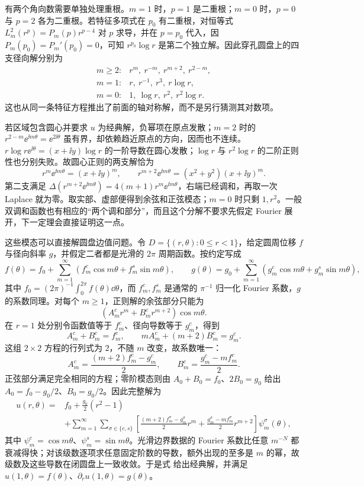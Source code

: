 有两个角向数需要单独处理重根。$m=1$ 时，$p=1$ 是二重根；$m=0$ 时，$p=0$ 与 $p=2$ 各为二重根。若特征多项式在 $p_0$ 有二重根，对恒等式
$L_m^2(r^p)=P_m(p)r^{p-4}$ 对 $p$ 求导，并在 $p=p_0$ 代入，因
$P_m(p_0)=P_m'(p_0)=0$，可知 $r^{p_0}\log r$ 是第二个独立解。因此穿孔圆盘上的四支径向解分别为
\[
\begin{array}{ll}
m\ge2:&r^m,\ r^{-m},\ r^{m+2},\ r^{2-m},\\
m=1:&r,\ r^{-1},\ r^3,\ r\log r,\\
m=0:&1,\ \log r,\ r^2,\ r^2\log r.
\end{array}
\]
这也从同一条特征方程推出了前面的轴对称解，而不是另行猜测其对数项。

若区域包含圆心并要求 $u$ 为经典解，负幂项在原点发散；$m=2$ 时的
$r^{2-m}\ee^{\ii m\theta}=\ee^{2\ii\theta}$ 虽有界，却依赖趋近原点的方向，因而也不连续。$r\log r\ee^{\ii\theta}=(x+\ii y)\log r$ 的一阶导数在圆心发散；$\log r$ 与 $r^2\log r$ 的二阶正则性也分别失败。故圆心正则的两支解恰为
\[
r^m\ee^{\ii m\theta}=(x+\ii y)^m,
\qquad
r^{m+2}\ee^{\ii m\theta}=(x^2+y^2)(x+\ii y)^m.
\]
第二支满足 $\Delta(r^{m+2}\ee^{\ii m\theta})=4(m+1)r^m\ee^{\ii m\theta}$，右端已经调和，再取一次 Laplace 就为零。取实部、虚部便得到余弦和正弦模态；$m=0$ 时只剩 $1,r^2$。一般双调和函数也有相应的“两个调和部分”，而且这个分解不要求先假定 Fourier 展开，下一定理会直接证明这一点。

这些模态可以直接解圆盘边值问题。令 $D=\{(r,\theta):0\le r<1\}$，给定圆周位移 $f$ 与径向斜率 $g$，并假定二者都是光滑的 $2\pi$ 周期函数。按约定写成
\[
f(\theta)=f_0+\sum_{m=1}^\infty(f_m^c\cos m\theta+f_m^s\sin m\theta),
\qquad
g(\theta)=g_0+\sum_{m=1}^\infty(g_m^c\cos m\theta+g_m^s\sin m\theta),
\]
其中 $f_0=(2\pi)^{-1}\int_0^{2\pi}f(\theta)\dd\theta$，而 $f_m^c,f_m^s$ 是通常的 $\pi^{-1}$ 归一化 Fourier 系数，$g$ 的系数同理。对每个 $m\ge1$，正则解的余弦部分只能为
\[
(A_m^c r^m+B_m^c r^{m+2})\cos m\theta.
\]
在 $r=1$ 处分别令函数值等于 $f_m^c$、径向导数等于 $g_m^c$，得到
\[
A_m^c+B_m^c=f_m^c,\qquad mA_m^c+(m+2)B_m^c=g_m^c.
\]
这组 $2\times2$ 方程的行列式为 $2$，不随 $m$ 改变，故系数唯一：
\[
A_m^c=\frac{(m+2)f_m^c-g_m^c}{2},\qquad
B_m^c=\frac{g_m^c-mf_m^c}{2}.
\]
正弦部分满足完全相同的方程；零阶模态则由 $A_0+B_0=f_0$、$2B_0=g_0$ 给出 $A_0=f_0-g_0/2$、$B_0=g_0/2$。因此完整解为
\begin{align}
u(r,\theta)={}&f_0+\frac{g_0}{2}(r^2-1)\\
&+\sum_{m=1}^\infty\sum_{\sigma\in\{c,s\}}
\left[\frac{(m+2)f_m^\sigma-g_m^\sigma}{2}r^m
+\frac{g_m^\sigma-mf_m^\sigma}{2}r^{m+2}\right]\psi_m^\sigma(\theta),
\label{eq:phys-cont-biharmonic-disk-solution}
\end{align}
其中 $\psi_m^c=\cos m\theta$、$\psi_m^s=\sin m\theta$。光滑边界数据的 Fourier 系数比任意 $m^{-N}$ 都衰减得快；对该级数逐项求任意固定阶数的导数，额外出现的至多是 $m$ 的幂，故级数及这些导数在闭圆盘上一致收敛。于是式 给出经典解，并满足 $u(1,\theta)=f(\theta)$、$\partial_ru(1,\theta)=g(\theta)$。

